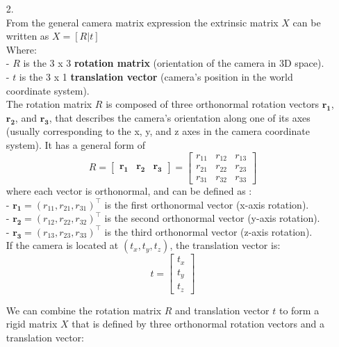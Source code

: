\documentclass[12pt]{report}
\begin{document}
\begin{enumerate}
\begin{enumerate}
    
    \item[2.]
    \ \\
    From the general camera matrix expression the extrinsic matrix $X$ can be written as $X = [R | t]$ \\
    Where:\\
    - \( R \) is the  3 x 3 \textbf{rotation matrix} (orientation of the camera in 3D space).\\
    - \( t \) is the  3 x 1 \textbf{translation vector} (camera's position in the world coordinate system).\\

    The rotation matrix \( R \) is composed of three orthonormal rotation vectors \( \mathbf{r_1} \), \( \mathbf{r_2} \), and \( \mathbf{r_3} \), that describes the camera's 
    orientation along one of its axes (usually corresponding to the x, y, and z axes in the camera coordinate system). It has a general form of 
    $$
    R = \begin{bmatrix}
    \mathbf{r_1} & \mathbf{r_2} & \mathbf{r_3}
    \end{bmatrix}
    =
    \begin{bmatrix}
    r_{11} & r_{12} & r_{13} \\
    r_{21} & r_{22} & r_{23} \\
    r_{31} & r_{32} & r_{33}
    \end{bmatrix}
    $$
    where each vector is orthonormal, and can be defined as : \\
    - \( \mathbf{r_1} = (r_{11}, r_{21}, r_{31})^\top \) is the first orthonormal vector (x-axis rotation). \\
    - \( \mathbf{r_2} = (r_{12}, r_{22}, r_{32})^\top \) is the second orthonormal vector (y-axis rotation). \\
    - \( \mathbf{r_3} = (r_{13}, r_{23}, r_{33})^\top \) is the third orthonormal vector (z-axis rotation). \\

    If the camera is located at \( (t_x, t_y, t_z) \), the translation vector is:
    $$
    t = \begin{bmatrix}
    t_x \\
    t_y \\
    t_z
    \end{bmatrix}
    $$

    We can combine the rotation matrix \( R \) and translation vector \( t \) to form a rigid matrix \( X \) that is defined by three orthonormal rotation vectors and a 
    translation vector:


\end{enumerate}
\end{enumerate}
\end{document}
